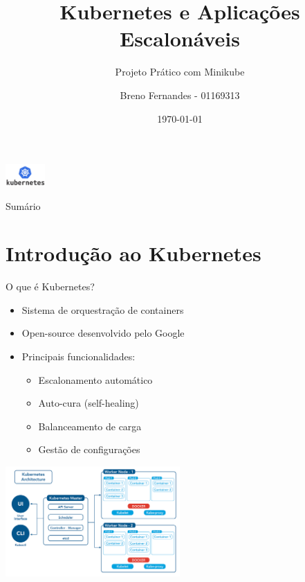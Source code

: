 \documentclass{beamer}
\title{Kubernetes e Aplicações Escalonáveis}
\subtitle{Projeto Prático com Minikube}
\author{Breno Fernandes - 01169313}
\institute{Uninassau}
\date{\today}
\begin{document}
\begin{frame}
    \centering
    \includegraphics[width=1.5cm]{Kubernetes-Logo.png}\\[0.5cm]
    \titlepage
\end{frame}

\begin{frame}{Sumário}
    \tableofcontents
\end{frame}

\section{Introdução ao Kubernetes}

\begin{frame}{O que é Kubernetes?}
    \begin{itemize}
        \item Sistema de orquestração de containers
        \item Open-source desenvolvido pelo Google
        \item Principais funcionalidades:
        \begin{itemize}
            \item Escalonamento automático
            \item Auto-cura (self-healing)
            \item Balanceamento de carga
            \item Gestão de configurações
        \end{itemize}
    \end{itemize}
    \centering
    \includegraphics[width=0.5\textwidth]{k8s-architecture.png}
\end{frame}
\end{document}
